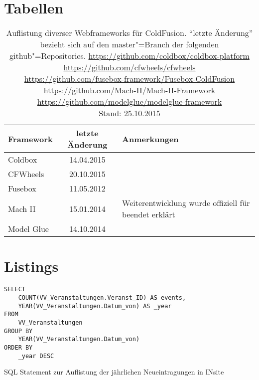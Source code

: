 \begin{appendices}
\chapter{Tabellen}
\renewcommand{\arraystretch}{1.2}
\begin{table}[ht!]
\centering
\begin{tabularx}{\textwidth}{lcX}
Framework & letzte Änderung & Anmerkungen \\
\hline
Coldbox & 14.04.2015  & \\
CFWheels & 20.10.2015 & \\
Fusebox & 11.05.2012 & \\
Mach II &  15.01.2014 & Weiterentwicklung wurde offiziell für beendet erklärt \cite{TeamMachII.2013} \\
Model Glue &  14.10.2014 & \\
\end{tabularx}
\caption[ColdFusion Frameworks]{
Auflistung diverser Webframeworks für ColdFusion. \enquote{letzte Änderung} bezieht sich auf den master"=Branch der folgenden github"=Repositories.
\url{https://github.com/coldbox/coldbox-platform}\\
\url{https://github.com/cfwheels/cfwheels}\\
\url{https://github.com/fusebox-framework/Fusebox-ColdFusion}\\
\url{https://github.com/Mach-II/Mach-II-Framework}\\
\url{https://github.com/modelglue/modelglue-framework}\\
Stand: 25.10.2015
}
\label{tab:ColdFusion.Frameworks}
\end{table}

\chapter{Listings}%


\begin{listing}
\begin{verbatim}
SELECT
	COUNT(VV_Veranstaltungen.Veranst_ID) AS events,
	YEAR(VV_Veranstaltungen.Datum_von) AS _year
FROM
	VV_Veranstaltungen
GROUP BY
	YEAR(VV_Veranstaltungen.Datum_von)
ORDER BY
	_year DESC
\end{verbatim}
\caption[SQL Statement zur Auflistung der jährlichen Neueintragungen in INsite]{SQL Statement zur Auflistung der jährlichen Neueintragungen in INsite}
\label{lst:sql_insite_events_per_year}
\end{listing}


\end{appendices}
